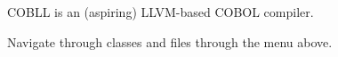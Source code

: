 COBLL is an (aspiring) LLVM-\/based COBOL compiler.

Navigate through classes and files through the menu above. 